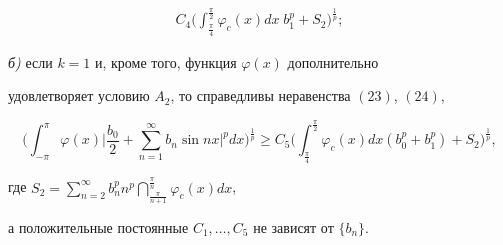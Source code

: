 \begin{lem}
\begin{align}
C_4\bigg( \int_{\frac{\pi}{4}}^{\frac{\pi}{2}}


\varphi_c(x)dx\; b_1^p+S_2\bigg)^


{\frac{1}{p}};


\end{align}





{\em б)} если $k=1$ и, кроме того, функция $\varphi(x)$ дополнительно


удовлетворяет условию $A_2$, то справедливы неравенства $(23)$, $(24)$,


\begin{equation}


\bigg( \int_{-\pi}^{\pi}\varphi(x)\bigg|\frac{b_0}{2} + 


\sum\limits_{n=1}^{\infty} b_n


\sin nx \bigg|^p dx \bigg)^{\frac{1}{p}} 


\geq C_5\bigg( \int_{\frac{\pi}{4}}^{\frac{\pi}{2}}


\varphi_c (x)dx (b_0^p+b_1^p)+ S_2\bigg)^{\frac{1}{p}},


\end{equation}


где $S_2 = \sum\limits_{n=2}^{\infty} b_n^p n^p 


\dint_{\frac{\pi}{n+1}}^{\frac{\pi}{n}}\varphi_c (x) dx$,


а положительные постоянные $C_1,\dotsc, C_5$ не зависят от $\{b_n\}$.


\end{lem}





